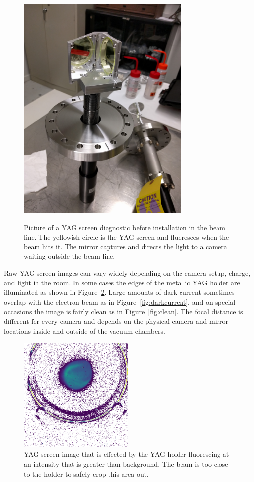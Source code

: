 \begin{figure}
	\centering
	\includegraphics[width=0.75\textwidth]{images/YAG_screen}
	\label{fig:YAGscreen}
	\caption{Picture of a YAG screen diagnostic before installation in the beam line.
	The yellowish circle is the YAG screen and fluoresces when the beam hits it. 
	The mirror captures and directs the light to a camera waiting outside the beam line.}
\end{figure}
Raw YAG screen images can vary widely depending on the camera setup, charge, and 
light in the room. In some cases the edges of the metallic YAG holder
 are illuminated as shown in Figure~\ref{fig:yag-holder}.
Large amounts of dark current sometimes overlap with the electron beam as in Figure~\ref{fig:darkcurrent}, 
and on special occasions the image is fairly clean as in Figure~\ref{fig:clean}. 
The focal distance is different for every camera and depends on the physical camera and mirror
locations inside and outside of the vacuum chambers.
\begin{figure}	
	\centering
	\includegraphics[width=0.5\textwidth]{images/yag-in-image}
	\caption{YAG screen image that is effected by the YAG holder fluorescing at an intensity that is greater than 
		background. The beam is too close to the holder to safely crop this area out.}
	\label{fig:yag-holder}
\end{figure}
